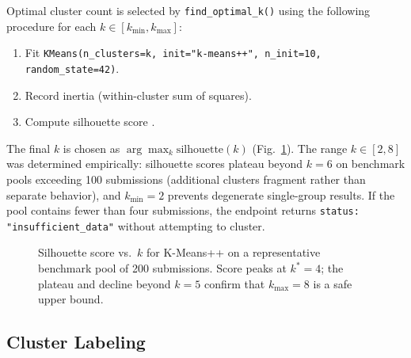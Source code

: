 \documentclass[conference]{IEEEtran}
\begin{document}
Optimal cluster count is selected by \texttt{find\_optimal\_k()} using
the following procedure for each $k \in [k_{\min}, k_{\max}]$:
\begin{enumerate}
  \item Fit \texttt{KMeans(n\_clusters=k, init="k-means++", n\_init=10,
        random\_state=42)}.
  \item Record inertia (within-cluster sum of squares).
  \item Compute silhouette score \cite{rousseeuw1987silhouettes}.
\end{enumerate}
The final $k$ is chosen as $\arg\max_k \text{silhouette}(k)$
(Fig.~\ref{fig:silhouette}).
The range $k \in [2, 8]$ was determined empirically: silhouette scores
plateau beyond $k = 6$ on benchmark pools exceeding 100 submissions
(additional clusters fragment rather than separate behavior), and
$k_{\min} = 2$ prevents degenerate single-group results.
If the pool contains fewer than four submissions, the endpoint returns
\texttt{status: "insufficient\_data"} without attempting to cluster.

\begin{figure}[ht]
\centering
{}
\caption{Silhouette score vs.\ $k$ for K-Means++ on a representative
benchmark pool of 200 submissions. Score peaks at $k^*=4$; the plateau
and decline beyond $k=5$ confirm that $k_{\max}=8$ is a safe upper bound.}
\label{fig:silhouette}
\end{figure}

\subsection{Cluster Labeling}
\end{document}
